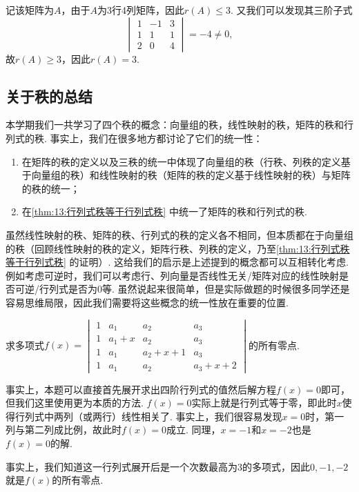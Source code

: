 \begin{solution}
    记该矩阵为$A$，由于$A$为3行4列矩阵，因此$r(A)\leqslant 3$. 又我们可以发现其三阶子式
    \[\begin{vmatrix}
            1 & -1 & 3 \\ 1 & 1 & 1 \\ 2 & 0 & 4
        \end{vmatrix}=-4\neq 0,\]
    故$r(A)\geqslant 3$，因此$r(A)=3$.
\end{solution}

\subsection{关于秩的总结}

本学期我们一共学习了四个秩的概念：向量组的秩，线性映射的秩，矩阵的秩和行列式的秩. 事实上，我们在很多地方都讨论了它们的统一性：
\begin{enumerate}
    \item 在矩阵的秩的定义以及三秩的统一中体现了向量组的秩（行秩、列秩的定义基于向量组的秩）和线性映射的秩（矩阵的秩的定义基于线性映射的秩）与矩阵的秩的统一；

    \item 在\autoref{thm:13:行列式秩等于行列式秩} 中统一了矩阵的秩和行列式的秩.
\end{enumerate}
虽然线性映射的秩、矩阵的秩、行列式的秩的定义各不相同，但本质都在于向量组的秩（回顾线性映射的秩的定义，矩阵行秩、列秩的定义，乃至\autoref*{thm:13:行列式秩等于行列式秩} 的证明）. 这给我们的启示是上述提到的概念都可以互相转化考虑. 例如考虑可逆时，我们可以考虑行、列向量是否线性无关/矩阵对应的线性映射是否可逆/行列式是否为0等. 虽然说起来很简单，但是实际做题的时候很多同学还是容易思维局限，因此我们需要将这些概念的统一性放在重要的位置.
\begin{example}
    求多项式$f(x)=\begin{vmatrix}
            1 & a_1   & a_2     & a_3     \\
            1 & a_1+x & a_2     & a_3     \\
            1 & a_1   & a_2+x+1 & a_3     \\
            1 & a_1   & a_2     & a_3+x+2
        \end{vmatrix}$的所有零点.
\end{example}

\begin{solution}
    事实上，本题可以直接首先展开求出四阶行列式的值然后解方程$f(x)=0$即可，但我们这里使用更为本质的方法. $f(x)=0$实际上就是行列式等于零，即此时$x$使得行列式中两列（或两行）线性相关了. 事实上，我们很容易发现$x=0$时，第一列与第二列成比例，故此时$f(x)=0$成立. 同理，$x=-1$和$x=-2$也是$f(x)=0$的解.

    事实上，我们知道这一行列式展开后是一个次数最高为3的多项式，因此$0,-1,-2$就是$f(x)$的所有零点.
\end{solution}

